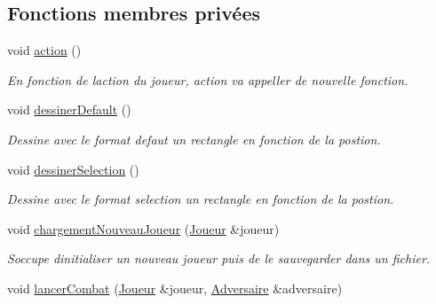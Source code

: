 \subsection*{Fonctions membres privées}
\begin{DoxyCompactItemize}
\item 
\mbox{\label{class_s_f_m_l_charger_a75660d35cc51c9efa18f1b3b46af14bc}} 
void \hyperlink{class_s_f_m_l_charger_a75660d35cc51c9efa18f1b3b46af14bc}{action} ()
\begin{DoxyCompactList}\small\item\em En fonction de l\textquotesingle{}action du joueur, action va appeller de nouvelle fonction. \end{DoxyCompactList}\item 
\mbox{\label{class_s_f_m_l_charger_a8383210117de42ee9eb4f2642cde599e}} 
void \hyperlink{class_s_f_m_l_charger_a8383210117de42ee9eb4f2642cde599e}{dessiner\+Default} ()
\begin{DoxyCompactList}\small\item\em Dessine avec le format defaut un rectangle en fonction de la postion. \end{DoxyCompactList}\item 
\mbox{\label{class_s_f_m_l_charger_a95d81b6e6b28deb26f571d58bba3765c}} 
void \hyperlink{class_s_f_m_l_charger_a95d81b6e6b28deb26f571d58bba3765c}{dessiner\+Selection} ()
\begin{DoxyCompactList}\small\item\em Dessine avec le format selection un rectangle en fonction de la postion. \end{DoxyCompactList}\item 
void \hyperlink{class_s_f_m_l_charger_a4c3135a3fa16c88f94cbef9c2ca2c2d8}{chargement\+Nouveau\+Joueur} (\hyperlink{class_joueur}{Joueur} \&joueur)
\begin{DoxyCompactList}\small\item\em S\textquotesingle{}occupe d\textquotesingle{}initialiser un nouveau joueur puis de le sauvegarder dans un fichier. \end{DoxyCompactList}\item 
void \hyperlink{class_s_f_m_l_charger_a988a052585ee0fe9e61535d5027a6f81}{lancer\+Combat} (\hyperlink{class_joueur}{Joueur} \&joueur, \hyperlink{class_adversaire}{Adversaire} \&adversaire)

\end{DoxyCompactItemize}
